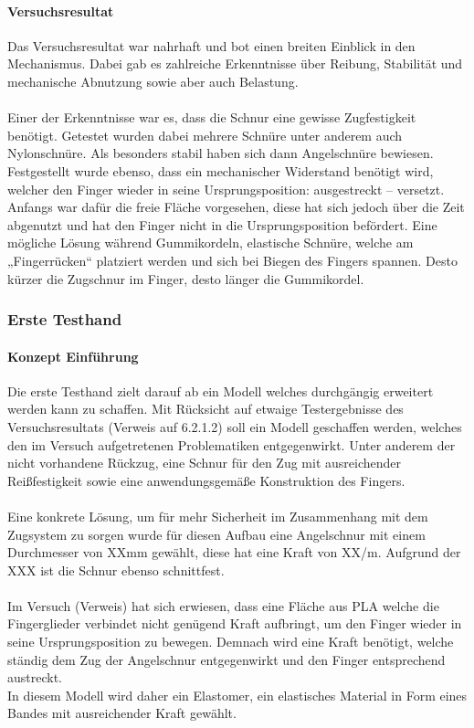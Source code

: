 \documentclass[titlepage,12pt,twoside]{article}
\begin{document}
\paragraph{Versuchsresultat}
\hfill \break
\hfill \break
Das Versuchsresultat war nahrhaft und bot einen breiten Einblick in den Mechanismus. 
Dabei gab es zahlreiche Erkenntnisse über Reibung, Stabilität und mechanische Abnutzung 
sowie aber auch Belastung. \\
\\
Einer der Erkenntnisse war es, dass die Schnur eine gewisse Zugfestigkeit benötigt. 
Getestet wurden dabei mehrere Schnüre unter anderem auch Nylonschnüre. Als besonders 
stabil haben sich dann Angelschnüre bewiesen.
Festgestellt wurde ebenso, dass ein mechanischer Widerstand benötigt wird, welcher den 
Finger wieder in seine Ursprungsposition: ausgestreckt – versetzt. Anfangs war dafür 
die freie Fläche vorgesehen, diese hat sich jedoch über die Zeit abgenutzt und hat den 
Finger nicht in die Ursprungsposition befördert. Eine mögliche Lösung während 
Gummikordeln, elastische Schnüre, welche am „Fingerrücken“ platziert werden und sich 
bei Biegen des Fingers spannen. Desto kürzer die Zugschnur im Finger, desto länger die 
Gummikordel. \\

\subsubsection{Erste Testhand}
\paragraph{Konzept Einführung}
\hfill \break
\hfill \break
Die erste Testhand zielt darauf ab ein Modell welches durchgängig erweitert 
werden kann zu schaffen. Mit Rücksicht auf etwaige Testergebnisse des 
Versuchsresultats (Verweis auf 6.2.1.2) soll ein Modell geschaffen werden, 
welches den im Versuch aufgetretenen Problematiken entgegenwirkt. Unter anderem 
der nicht vorhandene Rückzug, eine Schnur für den Zug mit ausreichender 
Reißfestigkeit sowie eine anwendungsgemäße Konstruktion des Fingers. \\
\\
Eine konkrete Lösung, um für mehr Sicherheit im Zusammenhang mit dem Zugsystem 
zu sorgen wurde für diesen Aufbau eine Angelschnur mit einem Durchmesser von 
XXmm gewählt, diese hat eine Kraft von XX/m. Aufgrund der XXX ist die Schnur 
ebenso schnittfest. \\
\\
Im Versuch (Verweis) hat sich erwiesen, dass eine Fläche aus PLA welche die 
Fingerglieder verbindet nicht genügend Kraft aufbringt, um den Finger wieder in 
seine Ursprungsposition zu bewegen. Demnach wird eine Kraft benötigt, welche 
ständig dem Zug der Angelschnur entgegenwirkt und den Finger entsprechend 
austreckt. \\
In diesem Modell wird daher ein Elastomer, ein elastisches Material in Form 
eines Bandes mit ausreichender Kraft gewählt. \\
\end{document}
